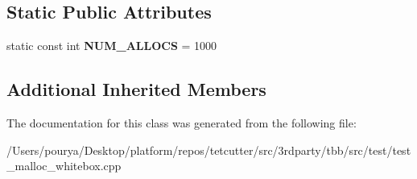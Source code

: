 \subsection*{Static Public Attributes}
\begin{DoxyCompactItemize}
\item 
\hypertarget{classTestCollapsingBootstrap_a4e117ed47c9831123202a77f3a4b6298}{}static const int {\bfseries N\+U\+M\+\_\+\+A\+L\+L\+O\+C\+S} = 1000\label{classTestCollapsingBootstrap_a4e117ed47c9831123202a77f3a4b6298}

\end{DoxyCompactItemize}
\subsection*{Additional Inherited Members}


The documentation for this class was generated from the following file\+:\begin{DoxyCompactItemize}
\item 
/\+Users/pourya/\+Desktop/platform/repos/tetcutter/src/3rdparty/tbb/src/test/test\+\_\+malloc\+\_\+whitebox.\+cpp\end{DoxyCompactItemize}
